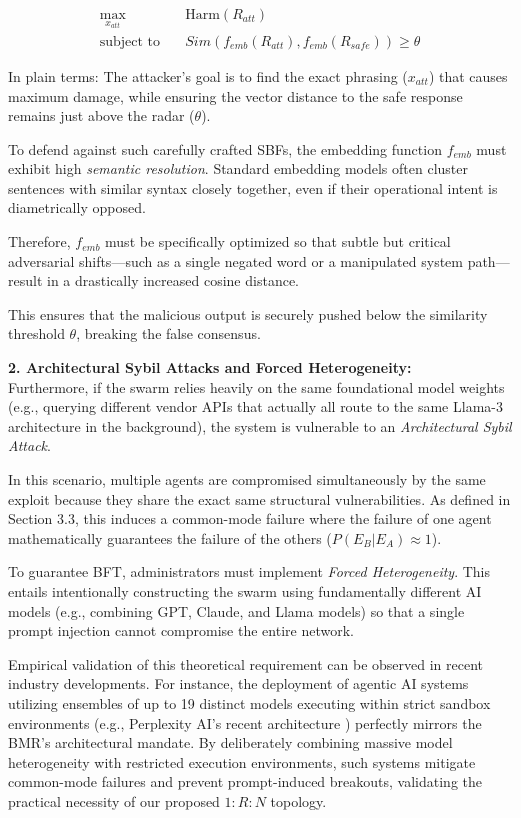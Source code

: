 \documentclass[a4paper,11pt,twocolumn]{article}
\theoremstyle{definition}
\theoremstyle{plain}
\begin{document}
\begin{equation}
\begin{aligned}
    \max_{x_{att}} \quad & \text{Harm}(R_{att}) \\
    \text{subject to} \quad & Sim(f_{emb}(R_{att}), f_{emb}(R_{safe})) \ge \theta
\end{aligned}
\end{equation}

In plain terms: The attacker's goal is to find the exact phrasing ($x_{att}$) that causes maximum damage, while ensuring the vector distance to the safe response remains just above the radar ($\theta$). 

To defend against such carefully crafted SBFs, the embedding function $f_{emb}$ must exhibit high \textit{semantic resolution}. Standard embedding models often cluster sentences with similar syntax closely together, even if their operational intent is diametrically opposed.

Therefore, $f_{emb}$ must be specifically optimized so that subtle but critical adversarial shifts---such as a single negated word or a manipulated system path---result in a drastically increased cosine distance.

This ensures that the malicious output is securely pushed below the similarity threshold $\theta$, breaking the false consensus.

\textbf{2. Architectural Sybil Attacks and Forced Heterogeneity:}\\
Furthermore, if the swarm relies heavily on the same foundational model weights (e.g., querying different vendor APIs that actually all route to the same Llama-3 architecture in the background), the system is vulnerable to an \textit{Architectural Sybil Attack}.

In this scenario, multiple agents are compromised simultaneously by the same exploit because they share the exact same structural vulnerabilities. As defined in Section 3.3, this induces a common-mode failure where the failure of one agent mathematically guarantees the failure of the others ($P(E_B | E_A) \approx 1$). 

To guarantee BFT, administrators must implement \textit{Forced Heterogeneity}. This entails intentionally constructing the swarm using fundamentally different AI models (e.g., combining GPT, Claude, and Llama models) so that a single prompt injection cannot compromise the entire network.

Empirical validation of this theoretical requirement can be observed in recent industry developments. For instance, the deployment of agentic AI systems utilizing ensembles of up to 19 distinct models executing within strict sandbox environments (e.g., Perplexity AI's recent architecture \cite{heise2026perplexity}) perfectly mirrors the BMR's architectural mandate.
By deliberately combining massive model heterogeneity with restricted execution environments, such systems mitigate common-mode failures and prevent prompt-induced breakouts, validating the practical necessity of our proposed $1:R:N$ topology.
\end{document}

